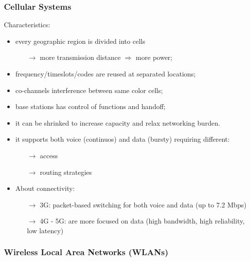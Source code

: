 \subsubsection{Cellular Systems}
Characteristics:
\begin{itemize}
    \setlength\itemsep{0.7em}
    \item every geographic region is divided into cells
    \begin{itemize}
        \item [$\rightarrow$] more transmission distance $\Rightarrow$
        more power;
    \end{itemize}
    \item frequency/timeslots/codes are reused at separated locations;
    \item co-channels interference between same color cells;
    \item base stations has control of functions and handoff;
    \item it can be shrinked to increase capacity and
    relax networking burden.
    \item it supports both voice (continuos) and data (bursty) requiring
    different:
    \begin{itemize}
        \item[$\rightarrow$] access
        \item[$\rightarrow$] routing strategies 
    \end{itemize}
    \item About connectivity:
    \begin{itemize}
        \item[$\rightarrow$] 3G: packet-based switching for both voice
        and data (up to 7.2 Mbps)
        \item[$\rightarrow$] 4G - 5G: are more focused on data
        (high bandwidth, high reliability, low latency)
    \end{itemize}
\end{itemize}

\subsubsection{Wireless Local Area Networks (WLANs)}

